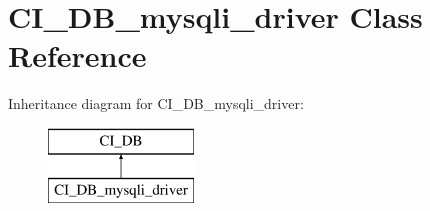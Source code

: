 \hypertarget{class_c_i___d_b__mysqli__driver}{\section{C\-I\-\_\-\-D\-B\-\_\-mysqli\-\_\-driver Class Reference}
\label{class_c_i___d_b__mysqli__driver}
}
Inheritance diagram for C\-I\-\_\-\-D\-B\-\_\-mysqli\-\_\-driver\-:\begin{figure}[H]
\begin{center}
\leavevmode
\includegraphics[height=2.000000cm]{class_c_i___d_b__mysqli__driver}
\end{center}
\end{figure}
